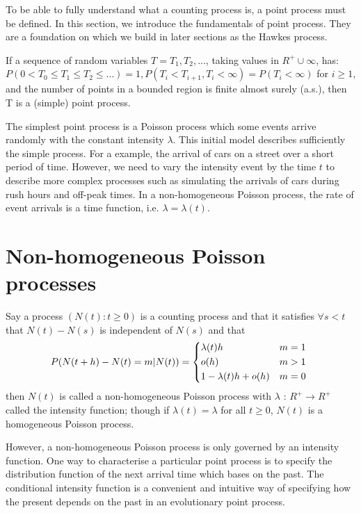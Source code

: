 To be able to fully understand what a counting process is, a point process must be defined. In this section, we introduce the fundamentals of point process. They are a foundation on which we build in later sections as the Hawkes process.

\begin{Definition}{}	
If a sequence of random variables $T = {T_{1}, T_{2}, . . . }$, taking values in $R^{+} \cup {\infty}$, has: $P(0 < T_{0} \leq T_{1} \leq T_{2} \leq . . . ) = 1, P(T_{i} < T_{i+1}, T_{i} < \infty) = P(T_{i} < \infty) $ for $i \geq 1 $, and the number of points in a bounded region is finite almost surely (a.s.), then T is a (simple) point process.
\label{Def Point process}
\end{Definition}

The simplest point process is a Poisson process which some events arrive randomly with the constant intensity $\lambda$. This initial model describes sufficiently the simple process. For a example, the arrival of cars on a street over a short period of time. However, we need to vary the intensity event by the time $t$ to describe more complex processes such as simulating the arrivals of cars during rush hours and off-peak times. In a non-homogeneous Poisson process, the rate of event arrivals is a time function, i.e. $\lambda = \lambda(t)$.

\section{Non-homogeneous Poisson processes}
\begin{Definition}{}	
Say a process $(N(t): t\geq 0)$ is a counting process and that it satisfies $ \forall s <t $ that $N(t)-N(s)$ is independent of $N(s)$ and that		
	\begin{align*}
	P(N(t + h) - N(t) = m \rvert N(t)) = 
	\begin{cases*}
	\lambda(t)h & $m = 1$ \\
	o(h) & $m > 1$  \\
	1-\lambda(t)h + o(h) & $ m = 0$  
	\end{cases*}  
	\end{align*}
then $N(t)$ is called a non-homogeneous Poisson process with $\lambda$ : $ R^{+} \rightarrow R^{+} $ called the intensity function; though if $\lambda(t) = \lambda $ for all $t \geq 0$, $N(t)$ is a homogeneous Poisson process.
\end{Definition}
However, a non-homogeneous Poisson process is only governed by an intensity function. One way to characterise a particular point process is to specify the distribution function of the next arrival time which bases on the past. The conditional intensity function is a convenient and intuitive way of specifying how the present depends on the past in an evolutionary point process.
